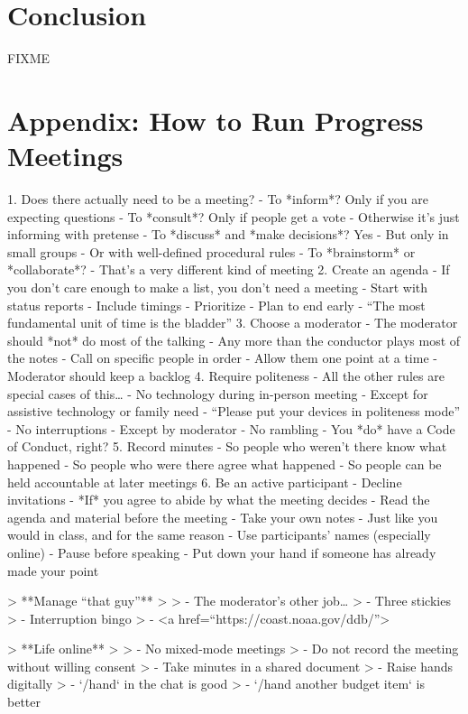 \documentclass[10pt,letterpaper]{article}
\begin{document}
\section*{Conclusion}

FIXME

\section*{Appendix: How to Run Progress Meetings}

1. Does there actually need to be a meeting?
   - To *inform*? Only if you are expecting questions
   - To *consult*? Only if people get a vote
     - Otherwise it's just informing with pretense
   - To *discuss* and *make decisions*? Yes
     - But only in small groups
     - Or with well-defined procedural rules
   - To *brainstorm* or *collaborate*?
     - That's a very different kind of meeting
2. Create an agenda
   - If you don't care enough to make a list, you don't need a meeting
   - Start with status reports
   - Include timings
   - Prioritize
   - Plan to end early
     - ``The most fundamental unit of time is the bladder''
3. Choose a moderator
   - The moderator should *not* do most of the talking
     - Any more than the conductor plays most of the notes
   - Call on specific people in order
   - Allow them one point at a time
   - Moderator should keep a backlog
4. Require politeness
   - All the other rules are special cases of this{\ldots}
   - No technology during in-person meeting
     - Except for assistive technology or family need
     - ``Please put your devices in politeness mode''
   - No interruptions
     - Except by moderator
   - No rambling
   - You *do* have a Code of Conduct, right?
5. Record minutes
   - So people who weren't there know what happened
   - So people who were there agree what happened
   - So people can be held accountable at later meetings
6. Be an active participant
   - Decline invitations
     - *If* you agree to abide by what the meeting decides
   - Read the agenda and material before the meeting
   - Take your own notes
     - Just like you would in class, and for the same reason \cite{Aiken1975,Bohay2011}
   - Use participants' names (especially online)
   - Pause before speaking
   - Put down your hand if someone has already made your point

> **Manage ``that guy''**
>
> - The moderator's other job{\ldots}
> - Three stickies
> - Interruption bingo
> - <a href=``https://coast.noaa.gov/ddb/''>

> **Life online**
>
> - No mixed-mode meetings
> - Do not record the meeting without willing consent
> - Take minutes in a shared document
> - Raise hands digitally
>   - `/hand` in the chat is good
>   - `/hand another budget item` is better
\end{document}
